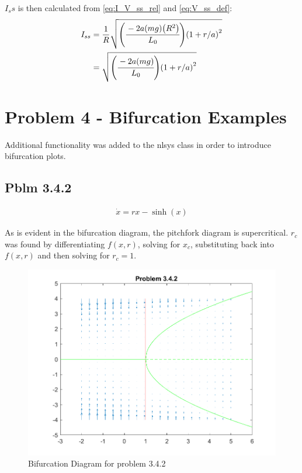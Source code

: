 \documentclass[letter]{article}
\begin{document}
$I_ss$ is then calculated from \eqref{eq:I_V_ss_rel} and \eqref{eq:V_ss_def}:
\begin{align}
	I_{ss}	&= \frac{1}{R} \sqrt{\qty(\cfrac{-2 a \qty(mg) \qty(R^2)}{L_0}) \qty(1+r/a)^2} \nonumber \\
			&= \sqrt{\qty(\cfrac{-2 a \qty(mg)}{L_0}) \qty(1+r/a)^2} \label{eq:I_ss_def}
\end{align}



\newpage
\section{Problem 4 - Bifurcation Examples}

Additional functionality was added to the nlsys class in order to introduce bifurcation plots.

\subsection{Pblm 3.4.2}

\begin{align*}
	\dot{x} = r x - \sinh(x)
\end{align*}

As is evident in the bifurcation diagram, the pitchfork diagram is supercritical. $r_c$ was found by differentiating $f(x,r)$, solving for $x_c$, substituting back into $f(x,r)$ and then solving for $r_c = 1$.


\begin{figure}[h]
	\centering
	\includegraphics[width=\linewidth]{fig/pblm4_342}
	\caption{Bifurcation Diagram for problem 3.4.2}
	\label{fig:pblm4342}
\end{figure}
\end{document}

